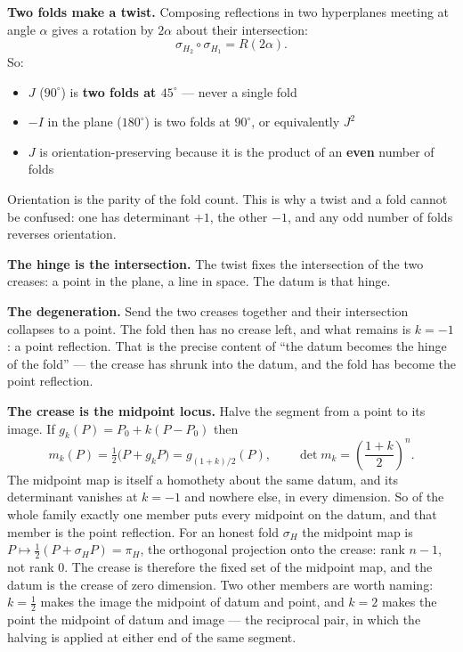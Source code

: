 \documentclass[11pt,fleqn]{article}
\begin{document}
\textbf{Two folds make a twist.} Composing reflections in two hyperplanes meeting at angle
$\alpha$ gives a rotation by $2\alpha$ about their intersection:
\begin{equation}
\sigma_{H_2} \circ \sigma_{H_1} = R(2\alpha).
\end{equation}
So:

\begin{itemize}
\item $J$ ($90^\circ$) is \textbf{two folds at $45^\circ$} --- never a single fold
\item $-I$ in the plane ($180^\circ$) is two folds at $90^\circ$, or equivalently $J^2$
\item $J$ is orientation-preserving because it is the product of an \textbf{even} number of folds
\end{itemize}

Orientation is the parity of the fold count. This is why a twist and a fold cannot be confused: one
has determinant $+1$, the other $-1$, and any odd number of folds reverses orientation.

\textbf{The hinge is the intersection.} The twist fixes the intersection of the two creases: a
point in the plane, a line in space. The datum is that hinge.

\textbf{The degeneration.} Send the two creases together and their intersection collapses to a
point. The fold then has no crease left, and what remains is $k = -1$: a point reflection. That is
the precise content of ``the datum becomes the hinge of the fold'' --- the crease has shrunk into
the datum, and the fold has become the point reflection.

\textbf{The crease is the midpoint locus.} Halve the segment from a point to its image. If
$g_k(P) = P_0 + k(P - P_0)$ then
\begin{equation}
m_k(P) = \tfrac{1}{2}\bigl(P + g_k P\bigr) = g_{(1+k)/2}(P),
\qquad
\det m_k = \left(\frac{1+k}{2}\right)^{n}.
\end{equation}
The midpoint map is itself a homothety about the same datum, and its determinant vanishes at
$k = -1$ and nowhere else, in every dimension. So of the whole family exactly one member puts every
midpoint on the datum, and that member is the point reflection. For an honest fold $\sigma_H$ the
midpoint map is $P \mapsto \tfrac{1}{2}(P + \sigma_H P) = \pi_H$, the orthogonal projection onto the
crease: rank $n - 1$, not rank $0$. The crease is therefore the fixed set of the midpoint map, and
the datum is the crease of zero dimension. Two other members are worth naming: $k = \tfrac{1}{2}$
makes the image the midpoint of datum and point, and $k = 2$ makes the point the midpoint of datum
and image --- the reciprocal pair, in which the halving is applied at either end of the same segment.
\end{document}
